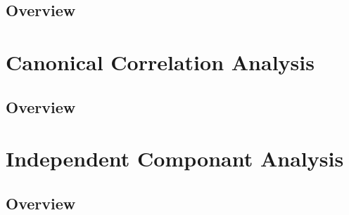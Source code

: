 \documentclass[11pt,fleqn]{book} %
\begin{document}
\section{Overview}



\chapter{Canonical Correlation Analysis}

\section{Overview}



\chapter{Independent Componant Analysis}

\section{Overview}



\end{document}
